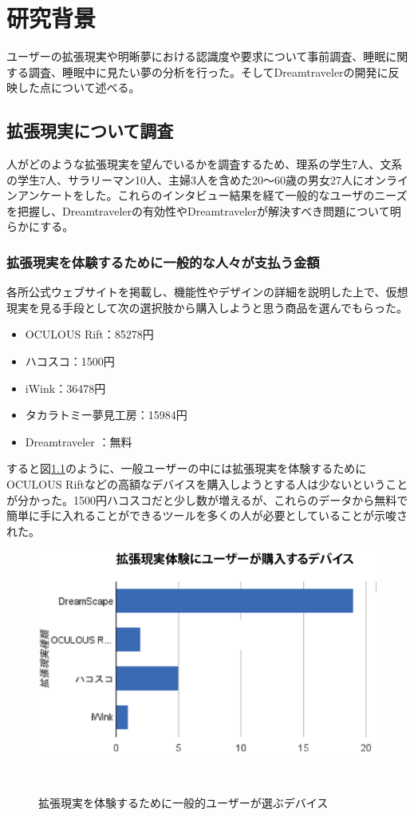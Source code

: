 \chapter{研究背景}
\label{chap:webapi}

 ユーザーの拡張現実や明晰夢における認識度や要求について事前調査、睡眠に関する調査、睡眠中に見たい夢の分析を行った。そしてDreamtravelerの開発に反映した点について述べる。

\section{拡張現実について調査}
人がどのような拡張現実を望んでいるかを調査するため、理系の学生7人、文系の学生7人、サラリーマン10人、主婦3人を含めた20〜60歳の男女27人にオンラインアンケートをした。これらのインタビュー結果を経て一般的なユーザのニーズを把握し、Dreamtravelerの有効性やDreamtravelerが解決すべき問題について明らかにする。

\subsection{拡張現実を体験するために一般的な人々が支払う金額}
各所公式ウェブサイトを掲載し、機能性やデザインの詳細を説明した上で、仮想現実を見る手段として次の選択肢から購入しようと思う商品を選んでもらった。

\begin{itemize}
\item OCULOUS Rift：85278円
\item ハコスコ：1500円
\item iWink：36478円
\item タカラトミー夢見工房：15984円
\item Dreamtraveler ：無料
\end{itemize}

すると図\ref{userNeedCost}のように、一般ユーザーの中には拡張現実を体験するためにOCULOUS Riftなどの高額なデバイスを購入しようとする人は少ないということが分かった。1500円ハコスコだと少し数が増えるが、これらのデータから無料で簡単に手に入れることができるツールを多くの人が必要としていることが示唆された。

\begin{figure}[htbp]
\begin{center}
\includegraphics[width=15cm]{eps/VRselection.eps}
\caption{拡張現実を体験するために一般的ユーザーが選ぶデバイス}
　\label{userNeedCost}
\end{center}
\end{figure}

